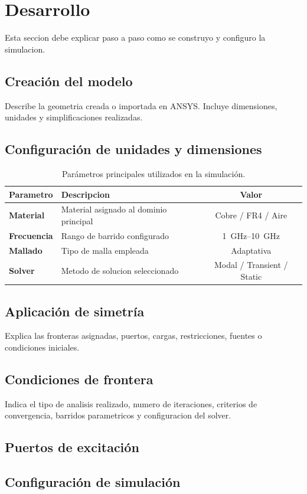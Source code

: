 \chapter{Desarrollo}
Esta seccion debe explicar paso a paso como se construyo y configuro la simulacion.

\section{Creación del modelo}
Describe la geometria creada o importada en ANSYS. Incluye dimensiones, unidades y simplificaciones realizadas.


\section{Configuración de unidades y dimensiones}

\begin{table}[H]
\centering
\caption{Parámetros principales utilizados en la simulación.}
\label{tab:parametros}
\begin{tabularx}{\linewidth}{>{\bfseries}l X c}
\toprule
Parametro & Descripcion & Valor \\
\midrule
Material & Material asignado al dominio principal & Cobre / FR4 / Aire \\
Frecuencia & Rango de barrido configurado & \SI{1}{GHz}--\SI{10}{GHz} \\
Mallado & Tipo de malla empleada & Adaptativa \\
Solver & Metodo de solucion seleccionado & Modal / Transient / Static \\
\bottomrule
\end{tabularx}
\end{table}

\section{Aplicación de simetría}
Explica las fronteras asignadas, puertos, cargas, restricciones, fuentes o condiciones iniciales.

\section{Condiciones de frontera}
Indica el tipo de analisis realizado, numero de iteraciones, criterios de convergencia, barridos parametricos y configuracion del solver.
\section{Puertos de excitación}
\section{Configuración de simulación}
